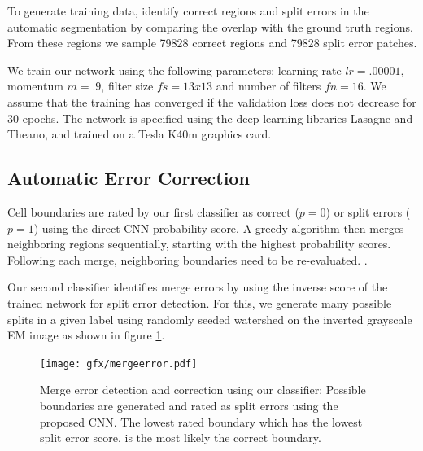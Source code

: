 To generate training data, identify correct regions and split errors in the automatic segmentation by comparing the overlap with the ground truth regions. From these regions we sample 79828 correct regions and 79828 split error patches.

We train our network using the following parameters: learning rate $lr=.00001$, momentum $m=.9$, filter size $fs=13x13$ and number of filters $fn=16$. We assume that the training has converged if the validation loss does not decrease for 30 epochs. The network is specified using the deep learning libraries Lasagne and Theano, and trained on a Tesla K40m graphics card. 

\subsection{Automatic Error Correction}
Cell boundaries are rated by our first classifier as correct ($p=0$) or split errors ($p=1$) using the direct CNN probability score. A greedy algorithm then merges neighboring regions sequentially, starting with the highest probability scores. Following each merge, neighboring boundaries need to be re-evaluated. .

Our second classifier identifies merge errors by using the inverse score of the trained network for split error detection. For this, we generate many possible splits in a given label using randomly seeded watershed on the inverted grayscale EM image as shown in figure \ref{fig:merge_error}.  

\begin{figure}[t]
\centering
\texttt{[image: gfx/mergeerror.pdf]}
\caption{Merge error detection and correction using our classifier: Possible boundaries are generated and rated as split errors using the proposed CNN. The lowest rated boundary which has the lowest split error score, is the most likely the correct boundary.}
\label{fig:merge_error}
\end{figure}
%
